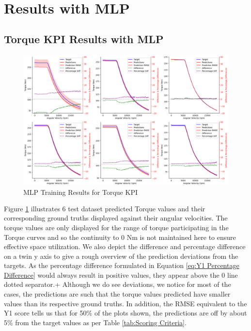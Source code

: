\documentclass{report} %
\begin{document}
\section{Results with \ac{MLP}}\label{sec:Results with MLP}
\subsection{Torque \ac{KPI} Results with \ac{MLP}}\label{sec:2D Torque Curve Results with MLP}

\begin{figure}[H]
    \centering
    \includegraphics[width=1\textwidth]{./ReportImages/KPI2D_predictions.png} 
    \caption{MLP Training Results for Torque \ac{KPI}} 
    \label{fig:MLP Training Results for 2D KPI(Torque)}
\end{figure}

Figure \ref{fig:MLP Training Results for 2D KPI(Torque)} illustrates 6 test dataset predicted Torque values and their corresponding ground truths displayed against their angular velocities.
The torque values are only displayed for the range of torque participating in the Torque curves and so the continuity to 0 Nm is not maintained here to ensure effective space 
utilization. We also depict the difference and percentage difference on a twin y axis to give a rough overview of the prediction deviations from the targets.
As the percentage difference formulated in Equation \ref{eq:Y1 Percentage Difference} would always result in positive values, they appear above the 0 line dotted separator.+
Although we do see deviations, we notice for most of the cases, the predictions are such that the torque values predicted have smaller values than its respective ground truths.
In addition, the \ac{RMSE} equivalent to the Y1 score tells us that for 50\% of the plots shown, the predictions are off by about 5\% from the target values as per 
Table \ref{tab:Scoring Criteria}.
\end{document}
